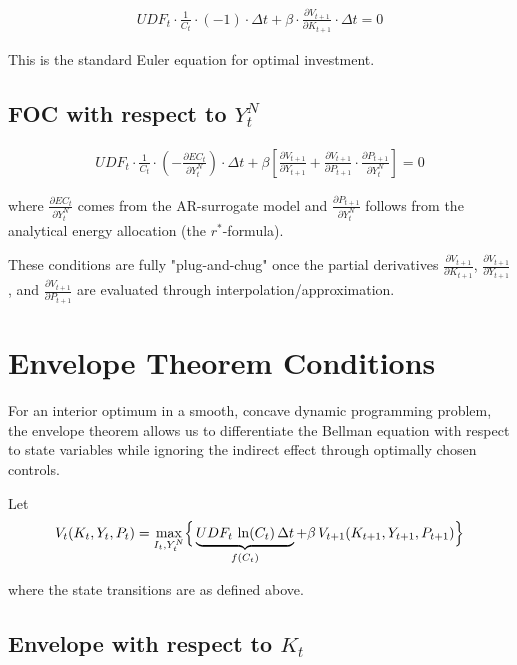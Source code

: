 \documentclass{article}
\begin{document}
\begin{align}
UDF_t \cdot \frac{1}{C_t} \cdot (-1) \cdot \Delta t + \beta \cdot \frac{\partial V_{t+1}}{\partial K_{t+1}} \cdot \Delta t = 0
\end{align}

This is the standard Euler equation for optimal investment.

\subsection{FOC with respect to $Y_t^N$}

\begin{align}
UDF_t \cdot \frac{1}{C_t} \cdot \left(-\frac{\partial EC_t}{\partial Y_t^N}\right) \cdot \Delta t + \beta \left[\frac{\partial V_{t+1}}{\partial Y_{t+1}} + \frac{\partial V_{t+1}}{\partial P_{t+1}} \cdot \frac{\partial P_{t+1}}{\partial Y_t^N}\right] = 0
\end{align}

where $\frac{\partial EC_t}{\partial Y_t^N}$ comes from the AR-surrogate model and $\frac{\partial P_{t+1}}{\partial Y_t^N}$ follows from the analytical energy allocation (the $r^*$-formula).

These conditions are fully "plug-and-chug" once the partial derivatives $\frac{\partial V_{t+1}}{\partial K_{t+1}}$, $\frac{\partial V_{t+1}}{\partial Y_{t+1}}$, and $\frac{\partial V_{t+1}}{\partial P_{t+1}}$ are evaluated through interpolation/approximation.

\section{Envelope Theorem Conditions}

For an interior optimum in a smooth, concave dynamic programming problem, the envelope theorem allows us to differentiate the Bellman equation with respect to state variables while ignoring the indirect effect through optimally chosen controls.

Let
\begin{align}
V_t(K_t,Y_t,P_t) = \max_{I_t,Y^N_t}\Bigl\{\,\underbrace{UDF_t\,\ln(C_t)\,\Delta t}_{f(C_t)} + \beta\,V_{t+1}(K_{t+1},Y_{t+1},P_{t+1})\Bigr\}
\end{align}

where the state transitions are as defined above.

\subsection{Envelope with respect to $K_t$}
\end{document}
